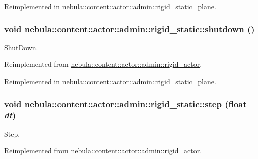 Reimplemented in \hyperlink{classnebula_1_1content_1_1actor_1_1admin_1_1rigid__static__plane_ac4b170a8bd046d8a9b8822cfd9ce89e5}{nebula::content::actor::admin::rigid\_\-static\_\-plane}.\hypertarget{classnebula_1_1content_1_1actor_1_1admin_1_1rigid__static_a813d55717971528046af12804e01ff4e}{
\subsubsection[{shutdown}]{\setlength{\rightskip}{0pt plus 5cm}void nebula::content::actor::admin::rigid\_\-static::shutdown ()}}
\label{classnebula_1_1content_1_1actor_1_1admin_1_1rigid__static_a813d55717971528046af12804e01ff4e}


ShutDown. 

Reimplemented from \hyperlink{classnebula_1_1content_1_1actor_1_1admin_1_1rigid__actor_afe9a6592087cac6054f6416d7c617eaa}{nebula::content::actor::admin::rigid\_\-actor}.

Reimplemented in \hyperlink{classnebula_1_1content_1_1actor_1_1admin_1_1rigid__static__plane_a40139ed218560b51d64612559be0564d}{nebula::content::actor::admin::rigid\_\-static\_\-plane}.\hypertarget{classnebula_1_1content_1_1actor_1_1admin_1_1rigid__static_a6f209af8d75aa5159b4a2d75fcf2701a}{
\subsubsection[{step}]{\setlength{\rightskip}{0pt plus 5cm}void nebula::content::actor::admin::rigid\_\-static::step (float {\em dt})}}
\label{classnebula_1_1content_1_1actor_1_1admin_1_1rigid__static_a6f209af8d75aa5159b4a2d75fcf2701a}


Step. 

Reimplemented from \hyperlink{classnebula_1_1content_1_1actor_1_1admin_1_1rigid__actor_aba5200b2e542e3f0433c89ef026c5673}{nebula::content::actor::admin::rigid\_\-actor}.

